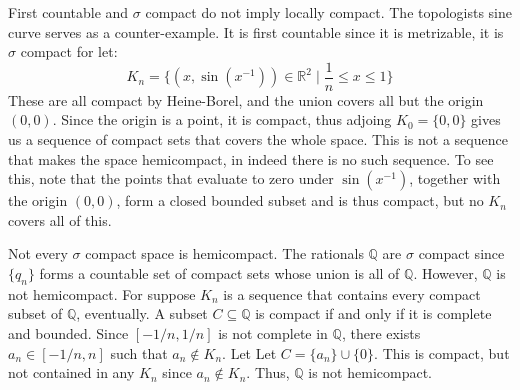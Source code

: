        \begin{example}
            First countable and $\sigma$ compact do not imply locally compact.
            The topologists sine curve serves as a counter-example. It is
            first countable since it is metrizable, it is $\sigma$ compact for
            let:
            \begin{equation}
                K_{n}=\{(x,\sin(x^{\minus{1}}))\in\mathbb{R}^{2}\;|\;
                    \frac{1}{n}\leq{x}\leq{1}\}
            \end{equation}
            These are all compact by Heine-Borel, and the union covers all but
            the origin $(0,0)$. Since the origin is a point, it is compact,
            thus adjoing $K_{0}=\{0,0\}$ gives us a sequence of compact sets
            that covers the whole space. This is not a sequence that makes
            the space hemicompact, in indeed there is no such sequence. To see
            this, note that the points that evaluate to zero under
            $\sin(x^{\minus{1}})$, together with the origin $(0,0)$, form a
            closed bounded subset and is thus compact, but no $K_{n}$ covers all
            of this.
        \end{example}
        \begin{example}
            Not every $\sigma$ compact space is hemicompact. The rationals
            $\mathbb{Q}$ are $\sigma$ compact since $\{q_{n}\}$ forms a
            countable set of compact sets whose union is all of $\mathbb{Q}$.
            However, $\mathbb{Q}$ is not hemicompact. For suppose
            $K_{n}$ is a sequence that contains every compact subset of
            $\mathbb{Q}$, eventually. A subset $C\subseteq\mathbb{Q}$ is compact
            if and only if it is complete and bounded. Since
            $[\minus{1}/n,1/n]$ is not complete in $\mathbb{Q}$, there exists
            $a_{n}\in[\minus{1}/n,n]$ such that $a_{n}\notin{K}_{n}$. Let
            Let $C=\{a_{n}\}\cup\{0\}$. This is compact, but not contained in
            any $K_{n}$ since $a_{n}\notin{K}_{n}$. Thus, $\mathbb{Q}$ is not
            hemicompact.
        \end{example}
